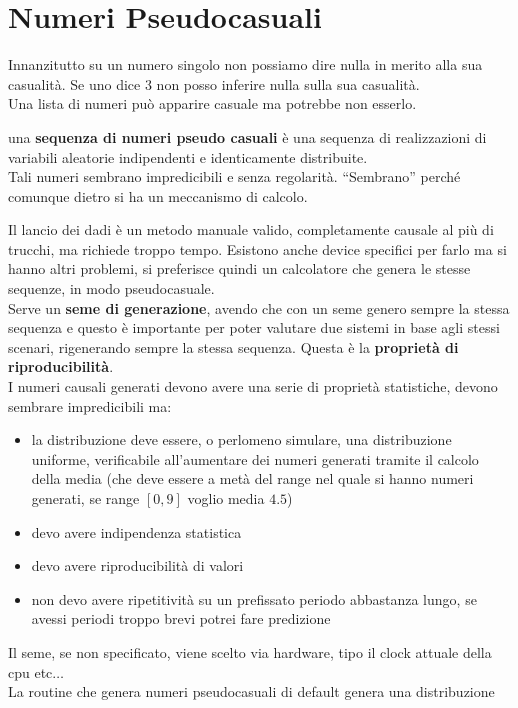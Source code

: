 \documentclass[a4paper,12pt, oneside]{book}
\begin{document}
\section{Numeri Pseudocasuali}
Innanzitutto su un numero singolo non possiamo dire nulla in merito alla sua
casualità. Se uno dice 3 non posso inferire nulla sulla sua casualità.\\
Una lista di numeri può apparire casuale ma potrebbe non esserlo.
\begin{definizione}
  una \textbf{sequenza di numeri pseudo casuali} è una sequenza di realizzazioni
  di 
  variabili aleatorie indipendenti e identicamente distribuite.\\
  Tali numeri sembrano impredicibili e senza regolarità. ``Sembrano'' perché
  comunque dietro si ha un meccanismo di calcolo.
\end{definizione}
Il lancio dei dadi è un metodo manuale valido, completamente causale al più di
trucchi, ma richiede troppo tempo. Esistono anche 
device specifici per farlo ma si hanno altri problemi, si preferisce quindi un
calcolatore che genera le stesse sequenze, in modo pseudocasuale.\\
Serve un \textbf{seme di generazione}, avendo che con un seme genero sempre la
stessa sequenza e questo è importante per poter valutare due sistemi in base
agli stessi scenari, rigenerando sempre la stessa sequenza. Questa è la
\textbf{proprietà di riproducibilità}.\\
I numeri causali generati devono avere una serie di proprietà statistiche,
devono sembrare impredicibili ma:
\begin{itemize}
  \item la distribuzione deve essere, o perlomeno simulare, una distribuzione
  uniforme, 
  verificabile all'aumentare dei 
  numeri generati tramite il calcolo della media (che deve essere a metà del
  range nel quale si hanno numeri generati, se range $[0,9]$ voglio media $4.5$)
  \item devo avere indipendenza statistica
  \item devo avere riproducibilità di valori
  \item non devo avere ripetitività su un prefissato periodo abbastanza lungo,
  se avessi periodi troppo brevi potrei fare predizione
\end{itemize}
Il seme, se non specificato, viene scelto via hardware, tipo il clock attuale
della cpu etc$\ldots$\\
La routine che genera numeri pseudocasuali di default genera una distribuzione
\end{document}
